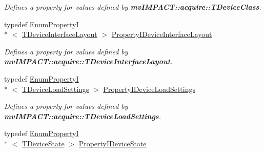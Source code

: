 \begin{DoxyCompactItemize}
\begin{DoxyCompactList}\small\item\em Defines a property for values defined by {\bfseries mv\+I\+M\+P\+A\+C\+T\+::acquire\+::\+T\+Device\+Class}. \end{DoxyCompactList}\item 
\hypertarget{group___common_interface_gab90d40765ad00c8bd36b05645f3472dc}{typedef \hyperlink{classmv_i_m_p_a_c_t_1_1acquire_1_1_enum_property_i}{Enum\+Property\+I}\\*
$<$ \hyperlink{group___common_interface_ga8206c9f9a594b7c21b43aaa624a86220}{T\+Device\+Interface\+Layout} $>$ \hyperlink{group___common_interface_gab90d40765ad00c8bd36b05645f3472dc}{Property\+I\+Device\+Interface\+Layout}}\label{group___common_interface_gab90d40765ad00c8bd36b05645f3472dc}

\begin{DoxyCompactList}\small\item\em Defines a property for values defined by {\bfseries mv\+I\+M\+P\+A\+C\+T\+::acquire\+::\+T\+Device\+Interface\+Layout}. \end{DoxyCompactList}\item 
\hypertarget{group___common_interface_ga8af4dfc27c6b4403fb87ad509f67181b}{typedef \hyperlink{classmv_i_m_p_a_c_t_1_1acquire_1_1_enum_property_i}{Enum\+Property\+I}\\*
$<$ \hyperlink{group___common_interface_gae5dacc6187e94639fe9153711917d6e3}{T\+Device\+Load\+Settings} $>$ \hyperlink{group___common_interface_ga8af4dfc27c6b4403fb87ad509f67181b}{Property\+I\+Device\+Load\+Settings}}\label{group___common_interface_ga8af4dfc27c6b4403fb87ad509f67181b}

\begin{DoxyCompactList}\small\item\em Defines a property for values defined by {\bfseries mv\+I\+M\+P\+A\+C\+T\+::acquire\+::\+T\+Device\+Load\+Settings}. \end{DoxyCompactList}\item 
\hypertarget{group___common_interface_ga1127fb45b2263d328e769e81b1096baf}{typedef \hyperlink{classmv_i_m_p_a_c_t_1_1acquire_1_1_enum_property_i}{Enum\+Property\+I}\\*
$<$ \hyperlink{group___common_interface_ga1207fea3233acb11831696cd74e142e8}{T\+Device\+State} $>$ \hyperlink{group___common_interface_ga1127fb45b2263d328e769e81b1096baf}{Property\+I\+Device\+State}}\label{group___common_interface_ga1127fb45b2263d328e769e81b1096baf}


\end{DoxyCompactItemize}
